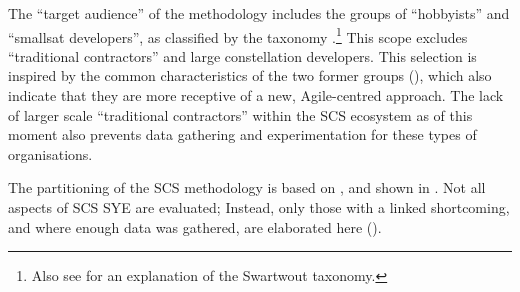 \documentclass[a4paper,nobib,justified,final]{tufte-book}
\begin{document}
The ``target audience'' of the methodology includes the groups of ``hobbyists'' and ``smallsat developers'', as classified by the \citeauthor{swartwoutYouSayPicosat2018} taxonomy \autocite{swartwoutYouSayPicosat2018}.\footnote{Also see  for an explanation of the Swartwout taxonomy.} This scope excludes ``traditional contractors'' and large constellation developers. This selection is inspired by the common characteristics of the two former groups (), which also indicate that they are more receptive of a new, Agile-centred approach. The lack of larger scale ``traditional contractors'' within the \acs{SCS} ecosystem as of this moment also prevents data gathering and experimentation for these types of organisations.

The partitioning of the \acs{SCS} methodology is based on , and shown in . Not all aspects of \acs{SCS} \acs{SYE} are evaluated; Instead, only those with a linked shortcoming, and where enough data was gathered, are elaborated here ().
\end{document}
